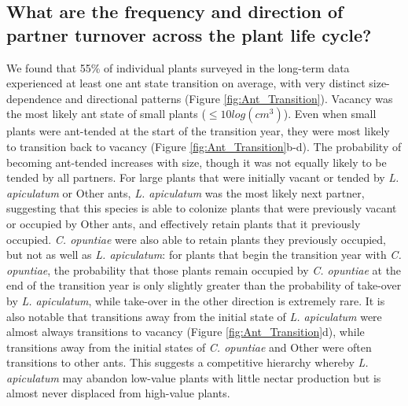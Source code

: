 \documentclass[11pt]{article}
\begin{document}
\subsection*{What are the frequency and direction of partner turnover across the plant life cycle?}
We found that 55\% of individual plants surveyed in the long-term data experienced at least one ant state transition on average, with very distinct size-dependence and directional patterns (Figure \ref{fig:Ant_Transition}). 
Vacancy was the most likely ant state of small plants ($\leq 10 log(cm^3)$).
Even when small plants were ant-tended at the start of the transition year, they were most likely to transition back to vacancy (Figure \ref{fig:Ant_Transition}b-d). 
The probability of becoming ant-tended increases with size, though it was not equally likely to be tended by all partners.  
For large plants that were initially vacant or tended by \textit{L. apiculatum} or Other ants, \textit{L. apiculatum} was the most likely next partner, suggesting that this species is able to colonize plants that were previously vacant or occupied by Other ants, and effectively retain plants that it previously occupied.  
\textit{C. opuntiae} were also able to retain plants they previously occupied, but not as well as \textit{L. apiculatum}: for plants that begin the transition year with \textit{C. opuntiae}, the probability that those plants remain occupied by \textit{C. opuntiae} at the end of the transition year is only slightly greater than the probability of take-over by \textit{L. apiculatum}, while take-over in the other direction is extremely rare. 
It is also notable that transitions away from the initial state of \textit{L. apiculatum} were almost always transitions to vacancy (Figure \ref{fig:Ant_Transition}d), while transitions away from the initial states of \textit{C. opuntiae} and Other  were often transitions to other ants. 
This suggests a competitive hierarchy whereby \textit{L. apiculatum} may abandon low-value plants with little nectar production but is almost never displaced from high-value plants. 
\end{document}
